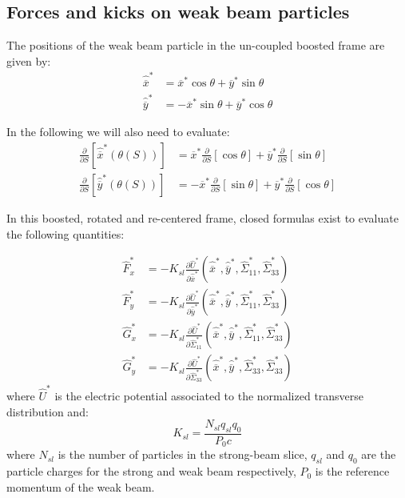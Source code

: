 \subsection{Forces and kicks on weak beam particles}

The positions of the weak beam particle in the un-coupled boosted frame are given by:
\begin{align}
\hat{\overline{x}}^* &= \overline{x}^*\cos \theta  + \overline{y}^*\sin \theta \\
\hat{\overline{y}}^* &= -\overline{x}^*\sin \theta  + \overline{y}^* \cos \theta
\end{align}

In the following we will also need to evaluate:
\begin{align}
\frac{\partial }{\partial S} \left[\hat{\overline{x}}^*\left(\theta (S)\right) \right] &= 
\overline{x}^*  \frac{\partial }{\partial S} \left[ \cos \theta \right] 
+ \overline{y}^*\frac{\partial }{\partial S} \left[ \sin \theta \right]  \\
\frac{\partial }{\partial S} \left[\hat{\overline{y}}^*\left(\theta (S)\right) \right] &= 
-\overline{x}^*  \frac{\partial }{\partial S} \left[ \sin \theta \right] 
+ \overline{y}^*\frac{\partial }{\partial S} \left[ \cos \theta \right]  
\end{align}



In this boosted, rotated and re-centered frame, closed formulas exist to evaluate the following quantities:

\begin{align}
\hat{F}^*_x &= -K_{sl} \frac{\partial \hat{U}^*}{\partial \hat{\overline{x}}^*}\left(\hat{\overline{x}}^*, \hat{\overline{y}}^* , \hat{\Sigma}^*_{11}, \hat{\Sigma}^*_{33}\right) \label{eq:firstf}\\
%
\hat{F}^*_y &= -K_{sl}\frac{\partial \hat{U}^*}{\partial \hat{\overline{y}}^*}\left(\hat{\overline{x}}^*, \hat{\overline{y}}^* , \hat{\Sigma}^*_{11}, \hat{\Sigma}^*_{33}\right)\\
%
\hat{G}^*_x &= -K_{sl}\frac{\partial \hat{U}^*}{\partial \hat{\Sigma}^*_{11}}\left(\hat{\overline{x}}^*, \hat{\overline{y}}^* , \hat{\Sigma}^*_{11}, \hat{\Sigma}^*_{33}\right)\\
%
\hat{G}^*_y &= -K_{sl}\frac{\partial \hat{U}^*}{\partial \hat{\Sigma}^*_{33}}\left(\hat{\overline{x}}^*, \hat{\overline{y}}^* , \hat{\Sigma}^*_{33}, \hat{\Sigma}^*_{33} \right) \label{eq:lastf}
\end{align}
where $\hat{U}^*$ is the electric potential associated to the normalized transverse distribution and:
\begin{equation}
K_{sl} = \frac{N_{sl} q_{sl} q_0}{P_0 c}
\label{eq:factor}
\end{equation}
where $N_{sl}$ is the number of particles in the strong-beam slice, $q_{sl}$ and $q_0$ are the particle charges for the strong and weak beam respectively, $P_0$ is the reference momentum of the weak beam.

